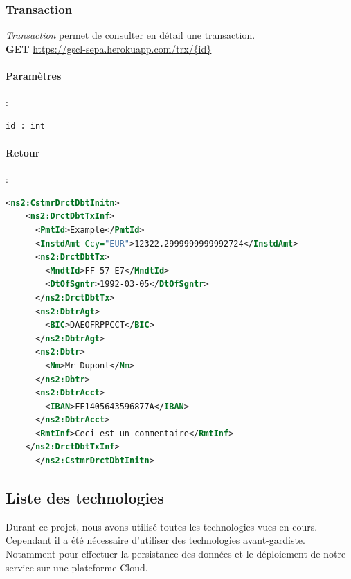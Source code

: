 \documentclass{article}
\begin{document}
      \subsubsection{Transaction}
	\emph{Transaction} permet de consulter en détail une transaction.\\
	\textbf{GET} \url{https://gscl-sepa.herokuapp.com/trx/{id}}
	\paragraph{Paramètres}:
	  \begin{lstlisting}[language=xml]
      id : int
	  \end{lstlisting}
	\paragraph{Retour}:
	  \begin{lstlisting}[language=xml]
      <ns2:CstmrDrctDbtInitn>
	<ns2:DrctDbtTxInf>
	  <PmtId>Example</PmtId>
	  <InstdAmt Ccy="EUR">12322.2999999999992724</InstdAmt>
	  <ns2:DrctDbtTx>
	    <MndtId>FF-57-E7</MndtId>
	    <DtOfSgntr>1992-03-05</DtOfSgntr>
	  </ns2:DrctDbtTx>
	  <ns2:DbtrAgt>
	    <BIC>DAEOFRPPCCT</BIC>
	  </ns2:DbtrAgt>
	  <ns2:Dbtr>
	    <Nm>Mr Dupont</Nm>
	  </ns2:Dbtr>
	  <ns2:DbtrAcct>
	    <IBAN>FE1405643596877A</IBAN>
	  </ns2:DbtrAcct>
	  <RmtInf>Ceci est un commentaire</RmtInf>
	</ns2:DrctDbtTxInf>
      </ns2:CstmrDrctDbtInitn>
	  \end{lstlisting}
    
    \subsection{Liste des technologies}
      Durant ce projet, nous avons utilisé toutes les technologies vues en cours. Cependant il a été nécessaire 
      d'utiliser des technologies avant-gardiste.
      Notamment pour effectuer la persistance des données et le déploiement de notre service sur une plateforme Cloud.
\end{document}
